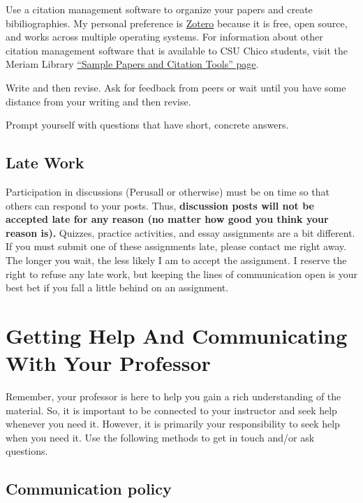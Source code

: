 \documentclass[11pt,]{article}
\begin{document}
Use a citation management software to organize your papers and create
bibiliographies. My personal preference is
\href{https://www.zotero.org/}{Zotero} because it is free, open source,
and works across multiple operating systems. For information about other
citation management software that is available to CSU Chico students,
visit the Meriam Library
\href{https://libguides.csuchico.edu/c.php?g=432300\&p=2948649}{``Sample
Papers and Citation Tools'' page}.

Write and then revise. Ask for feedback from peers or wait until you
have some distance from your writing and then revise.

Prompt yourself with questions that have short, concrete answers.

\hypertarget{late-work}{%
\subsection{Late Work}\label{late-work}}

Participation in discussions (Perusall or otherwise) must be on time so
that others can respond to your posts. Thus, \textbf{discussion posts
will not be accepted late for any reason (no matter how good you think
your reason is).} Quizzes, practice activities, and essay assignments
are a bit different. If you must submit one of these assignments late,
please contact me right away. The longer you wait, the less likely I am
to accept the assignment. I reserve the right to refuse any late work,
but keeping the lines of communication open is your best bet if you fall
a little behind on an assignment.

\hypertarget{getting-help-and-communicating-with-your-professor}{%
\section{Getting Help And Communicating With Your
Professor}\label{getting-help-and-communicating-with-your-professor}}

Remember, your professor is here to help you gain a rich understanding
of the material. So, it is important to be connected to your instructor
and seek help whenever you need it. However, it is primarily your
responsibility to seek help when you need it. Use the following methods
to get in touch and/or ask questions.

\hypertarget{communication-policy}{%
\subsection{Communication policy}\label{communication-policy}}
\end{document}
